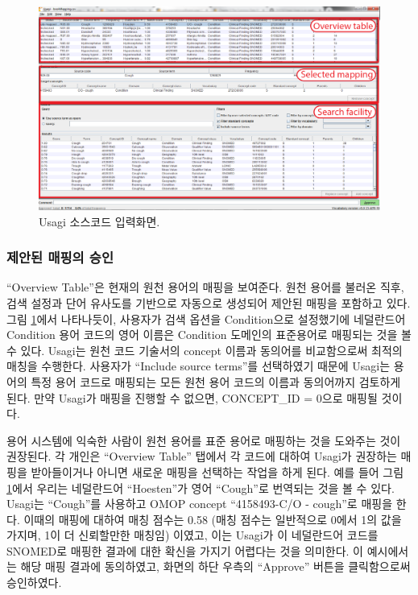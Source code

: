 \documentclass[10.5pt]{book}
\theoremstyle{definition}
\theoremstyle{definition}
\theoremstyle{definition}
\theoremstyle{remark}
\begin{document}
\begin{figure}

{\centering \includegraphics[width=1\linewidth]{images/ExtractTransformLoad/usagiOverview} 

}

\caption{Usagi 소스코드 입력화면.}\label{fig:usagiOverview}
\end{figure}

\subsubsection*{제안된 매핑의 승인}\label{--}

``Overview Table''은 현재의 원천 용어의 매핑을 보여준다. 원천 용어를
불러온 직후, 검색 설정과 단어 유사도를 기반으로 자동으로 생성되어 제안된
매핑을 포함하고 있다. 그림 \ref{fig:usagiOverview}에서 나타나듯이,
사용자가 검색 옵션을 Condition으로 설정했기에 네덜란드어 Condition 용어
코드의 영어 이름은 Condition 도메인의 표준용어로 매핑되는 것을 볼 수
있다. Usagi는 원천 코드 기술서의 concept 이름과 동의어를 비교함으로써
최적의 매칭을 수행한다. 사용자가 ``Include source terms''를 선택하였기
때문에 Usagi는 용어의 특정 용어 코드로 매핑되는 모든 원천 용어 코드의
이름과 동의어까지 검토하게 된다. 만약 Usagi가 매핑을 진행할 수 없으면,
CONCEPT\_ID = 0으로 매핑될 것이다.

용어 시스템에 익숙한 사람이 원천 용어를 표준 용어로 매핑하는 것을
도와주는 것이 권장된다. 각 개인은 ``Overview Table'' 탭에서 각 코드에
대하여 Usagi가 권장하는 매핑을 받아들이거나 아니면 새로운 매핑을
선택하는 작업을 하게 된다. 예를 들어 그림 \ref{fig:usagiOverview}에서
우리는 네덜란드어 ``Hoesten''가 영어 ``Cough''로 번역되는 것을 볼 수
있다. Usagi는 ``Cough''를 사용하고 OMOP concept ``4158493-C/O -
cough''로 매핑을 한다. 이때의 매핑에 대하여 매칭 점수는 0.58 (매칭
점수는 일반적으로 0에서 1의 값을 가지며, 1이 더 신뢰할만한 매칭임)
이였고, 이는 Usagi가 이 네덜란드어 코드를 SNOMED로 매핑한 결과에 대한
확신을 가지기 어렵다는 것을 의미한다. 이 예시에서는 해당 매핑 결과에
동의하였고, 화면의 하단 우측의 ``Approve'' 버튼을 클릭함으로써
승인하였다.
\end{document}
